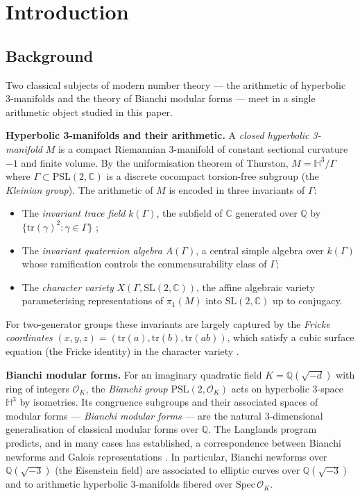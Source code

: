 
\section{Introduction}
\label{sec:intro}

\subsection{Background}

Two classical subjects of modern number theory — the arithmetic of
hyperbolic 3-manifolds and the theory of Bianchi modular forms — meet
in a single arithmetic object studied in this paper.

\medskip
\textbf{Hyperbolic 3-manifolds and their arithmetic.}
A \emph{closed hyperbolic 3-manifold} $M$ is a compact Riemannian
3-manifold of constant sectional curvature $-1$ and finite volume.
By the uniformisation theorem of Thurston, $M = \mathbb{H}^3 / \Gamma$
where $\Gamma \subset \mathrm{PSL}(2,\mathbb{C})$ is a discrete cocompact
torsion-free subgroup (the \emph{Kleinian group}).
The arithmetic of $M$ is encoded in three invariants of $\Gamma$:
\begin{itemize}
  \item The \emph{invariant trace field} $k(\Gamma)$, the subfield of
        $\mathbb{C}$ generated over $\mathbb{Q}$ by $\{\mathrm{tr}(\gamma)^2
        : \gamma \in \Gamma\}$ \cite{MFW};
  \item The \emph{invariant quaternion algebra} $A(\Gamma)$, a central
        simple algebra over $k(\Gamma)$ whose ramification controls the
        commensurability class of $\Gamma$;
  \item The \emph{character variety} $X(\Gamma, \mathrm{SL}(2,\mathbb{C}))$,
        the affine algebraic variety parameterising representations of
        $\pi_1(M)$ into $\mathrm{SL}(2,\mathbb{C})$ up to conjugacy.
\end{itemize}
For two-generator groups these invariants are largely captured by the
\emph{Fricke coordinates} $(x, y, z) = (\mathrm{tr}(a), \mathrm{tr}(b),
\mathrm{tr}(ab))$, which satisfy a cubic surface equation (the Fricke
identity) in the character variety \cite{Goldman}.

\medskip
\textbf{Bianchi modular forms.}
For an imaginary quadratic field $K = \mathbb{Q}(\sqrt{-d})$ with ring
of integers $\mathcal{O}_K$, the \emph{Bianchi group}
$\mathrm{PSL}(2, \mathcal{O}_K)$ acts on hyperbolic 3-space $\mathbb{H}^3$
by isometries. Its congruence subgroups and their associated spaces of
modular forms — \emph{Bianchi modular forms} — are the natural 3-dimensional
generalisation of classical modular forms over $\mathbb{Q}$.
The Langlands program predicts, and in many cases has established,
a correspondence between Bianchi newforms and Galois representations
\cite{TaylorWiles, Berger}.
In particular, Bianchi newforms over $\mathbb{Q}(\sqrt{-3})$ (the
Eisenstein field) are associated to elliptic curves over
$\mathbb{Q}(\sqrt{-3})$ and to arithmetic hyperbolic 3-manifolds fibered
over $\mathrm{Spec}\,\mathcal{O}_K$.

